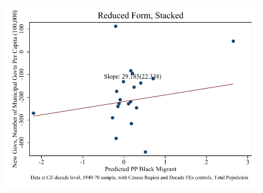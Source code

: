 \documentclass{article}
\begin{document}
\begin{figure}
\centering
\includegraphics{figures/simplefigs/stacked_gen_muni_pc_C3_total_rf.pdf}
\end{figure}
\clearpage
\end{document}
